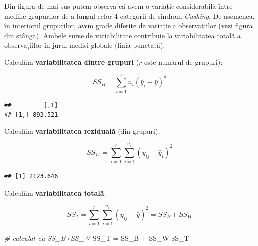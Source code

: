 \documentclass[]{article}
\newenvironment{Shaded}{\begin{snugshade}}{\end{snugshade}}
\newcommand{\KeywordTok}[1]{\textcolor[rgb]{0.13,0.29,0.53}{\textbf{{#1}}}}
\newcommand{\DecValTok}[1]{\textcolor[rgb]{0.00,0.00,0.81}{{#1}}}
\newcommand{\StringTok}[1]{\textcolor[rgb]{0.31,0.60,0.02}{{#1}}}
\newcommand{\CommentTok}[1]{\textcolor[rgb]{0.56,0.35,0.01}{\textit{{#1}}}}
\newcommand{\NormalTok}[1]{{#1}}
\begin{document}
Din figura de mai sus putem observa că avem o variație considerabilă
între mediile grupurilor de-a lungul celor 4 categorii de sindrom
\emph{Cushing}. De asemenea, în interiorul grupurilor, avem grade
diferite de variație a observațiilor (vezi figura din stânga). Ambele
surse de variabilitate contribuie la variabilitatea totală a
observațiilor în jurul mediei globale (linia punctată).

Calculăm \textbf{variabilitatea dintre grupuri} (\(r\) este numărul de
grupuri):

\[
  SS_{B}=\sum_{i=1}^{r}n_i(\bar{y}_i-\bar{y})^2
\]

\begin{Shaded}
\end{Shaded}

\begin{verbatim}
##         [,1]
## [1,] 893.521
\end{verbatim}

Calculăm \textbf{variabilitatea reziduală} (din grupuri):

\[
  SS_{W}=\sum_{i=1}^{r}\sum_{j = 1}^{n_i}(y_{ij}-\bar{y}_i)^2
\]

\begin{Shaded}
\end{Shaded}

\begin{verbatim}
## [1] 2123.646
\end{verbatim}

Calculăm \textbf{variabilitatea totală}:

\[
  SS_{T} = \sum_{i=1}^{r}\sum_{j = 1}^{n_i}(y_{ij}-\bar{y})^2 = SS_{B}+SS_{W}
\]

\begin{Shaded}
\begin{Highlighting}[]
\CommentTok{# calculat cu SS_B+SS_W}
\NormalTok{SS_T =}\StringTok{ }\NormalTok{SS_B +}\StringTok{ }\NormalTok{SS_W}
\NormalTok{SS_T}
\end{Highlighting}
\end{Shaded}
\end{document}
